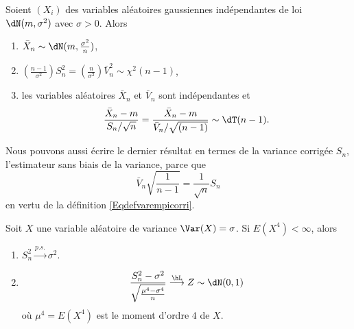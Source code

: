 \begin{theorem}     \label{ThoCochraneChiStudent}  
	Soient \( (X_i)\) des variables aléatoires gaussiennes indépendantes de loi \( \dN(m,\sigma^2)\) avec \( \sigma>0\). Alors
	\begin{enumerate}
		\item
		      \( \bar X_n\sim\dN(m,\frac{ \sigma^2 }{ n })\),
		\item       \label{ItemThoCochraneChiStudentii}
		      \( \left( \frac{ n-1 }{ \sigma^2 } \right)S_n^2=\left( \frac{ n }{ \sigma^2 } \right)\bar V_n^2\sim\chi^2(n-1)\),
		\item
		      les variables aléatoires \( \bar X_n\) et \( \bar V_n\) sont indépendantes et
		      \begin{equation}
			      \frac{ \bar X_n-m }{ S_n/\sqrt{n} }=\frac{ \bar X_n-m }{\bar V_n / \sqrt{(n-1)} }\sim\dT(n-1).
		      \end{equation}
	\end{enumerate}
\end{theorem}
Nous pouvons aussi écrire le dernier résultat en termes de la variance corrigée \( S_n\), l'estimateur sans biais de la variance, parce que
\begin{equation}
	\bar V_n\sqrt{\frac{ 1 }{ n-1 }}=\frac{1}{ \sqrt{n} }S_n
\end{equation}
en vertu de la définition \eqref{Eqdefvarempicorri}.


\begin{proposition}
	Soit \( X\) une variable aléatoire de variance \( \Var(X)=\sigma\). Si \( E(X^4)<\infty\), alors
	\begin{enumerate}
		\item
		      \( S_n^2\stackrel{p.s.}{\longrightarrow}\sigma^2\).
		\item
		      \begin{equation}
			      \frac{ S_n^2-\sigma^2 }{ \sqrt{\frac{ \mu^4-\sigma^4 }{ n }} }\stackrel{\hL}{\longrightarrow}Z\sim\dN(0,1)
		      \end{equation}
		      où \( \mu^4=E(X^4)\) est le moment d'ordre \( 4\) de \( X\).
	\end{enumerate}
\end{proposition}

